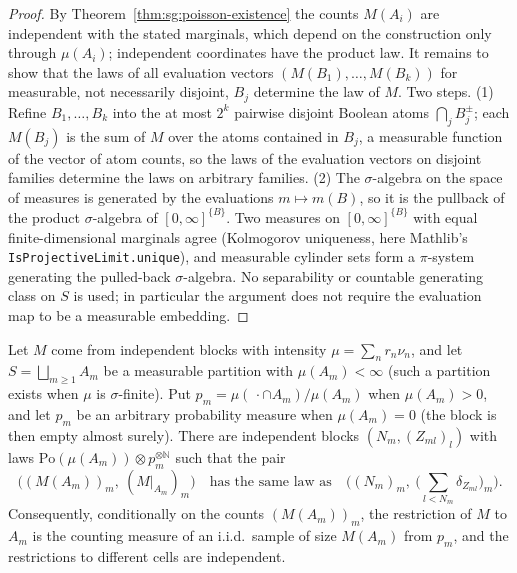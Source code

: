 \begin{proof}
  \leanok
{}
By Theorem~\ref{thm:sg:poisson-existence} the counts $M(A_i)$ are independent with the stated marginals, which depend on the construction only through $\mu(A_i)$; independent coordinates have the product law. It remains to show that the laws of all evaluation vectors $(M(B_1),\dots,M(B_k))$ for measurable, not necessarily disjoint, $B_j$ determine the law of $M$. Two steps. (1) Refine $B_1,\dots,B_k$ into the at most $2^k$ pairwise disjoint Boolean atoms $\bigcap_jB_j^{\pm}$; each $M(B_j)$ is the sum of $M$ over the atoms contained in $B_j$, a measurable function of the vector of atom counts, so the laws of the evaluation vectors on disjoint families determine the laws on arbitrary families. (2) The $\sigma$-algebra on the space of measures is generated by the evaluations $m\mapsto m(B)$, so it is the pullback of the product $\sigma$-algebra of $[0,\infty]^{\{B\}}$. Two measures on $[0,\infty]^{\{B\}}$ with equal finite-dimensional marginals agree (Kolmogorov uniqueness, here Mathlib's \texttt{IsProjectiveLimit.unique}), and measurable cylinder sets form a $\pi$-system generating the pulled-back $\sigma$-algebra. No separability or countable generating class on $S$ is used; in particular the argument does not require the evaluation map to be a measurable embedding.
\end{proof}

\begin{theorem}\label{thm:sg:poisson-partition}
  \leanok
Let $M$ come from independent blocks with intensity $\mu=\sum_nr_n\nu_n$, and let $S=\bigsqcup_{m\ge1}A_m$ be a measurable partition with $\mu(A_m)<\infty$ (such a partition exists when $\mu$ is $\sigma$-finite). Put $p_m=\mu(\,\cdot\cap A_m)/\mu(A_m)$ when $\mu(A_m)>0$, and let $p_m$ be an arbitrary probability measure when $\mu(A_m)=0$ (the block is then empty almost surely). There are independent blocks $(N_m,(Z_{ml})_l)$ with laws $\mathrm{Po}(\mu(A_m))\otimes p_m^{\otimes\mathbb N}$ such that the pair
$$\big((M(A_m))_m,\ (M|_{A_m})_m\big)\quad\text{has the same law as}\quad\Big((N_m)_m,\ \big(\textstyle\sum_{l<N_m}\delta_{Z_{ml}}\big)_m\Big).$$
Consequently, conditionally on the counts $(M(A_m))_m$, the restriction of $M$ to $A_m$ is the counting measure of an i.i.d.\ sample of size $M(A_m)$ from $p_m$, and the restrictions to different cells are independent.
\end{theorem}

